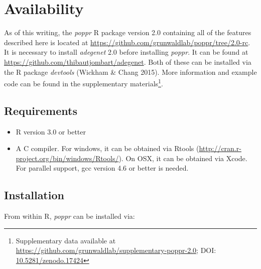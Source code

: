 \documentclass[double,12pt]{beavtex}
\providecommand{\tightlist}{%
  \setlength{\itemsep}{0pt}\setlength{\parskip}{0pt}}
\begin{document}
  \section{Availability}\label{availability}
  
  As of this writing, the \emph{poppr} R package version 2.0 containing
  all of the features described here is located at
  \url{https://github.com/grunwaldlab/poppr/tree/2.0-rc}. It is necessary
  to install \emph{adegenet} 2.0 before installing \emph{poppr}. It can be
  found at \url{https://github.com/thibautjombart/adegenet}. Both of these
  can be installed via the R package \emph{devtools} (Wickham \& Chang
  2015). More information and example code can be found in the
  supplementary materials\footnote{Supplementary data available at
    \url{https://github.com/grunwaldlab/supplementary-poppr-2.0}; DOI:
    \href{http://dx.doi.org/10.5281/zenodo.17424}{10.5281/zenodo.17424}}.
  
  \subsection{Requirements}\label{requirements}
  
  \begin{itemize}
  \tightlist
  \item
    R version 3.0 or better
  \item
    A C compiler. For windows, it can be obtained via Rtools
    (\url{http://cran.r-project.org/bin/windows/Rtools/}). On OSX, it can
    be obtained via Xcode. For parallel support, gcc version 4.6 or better
    is needed.
  \end{itemize}
  
  \subsection{Installation}\label{installation}
  
  From within R, \emph{poppr} can be installed via:
  
  \begin{Shaded}
  \begin{Highlighting}[]
  \NormalTok{(}\NormalTok{)}
  \NormalTok{(}\NormalTok{)}
  \NormalTok{(}\NormalTok{)}
  \NormalTok{(}\NormalTok{)}
  \end{Highlighting}
  \end{Shaded}
  
\end{document}
